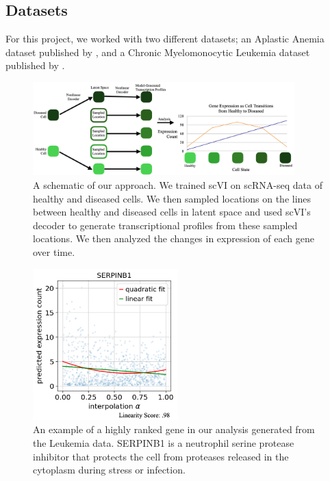 \documentclass{article}
\begin{document}
\subsection{Datasets}
For this project, we worked with two different datasets; an Aplastic Anemia dataset published by \citet{tonglin_single-cell_2022}, and a Chronic Myelomonocytic Leukemia dataset published by \citet{ferrall-fairbanks_progenitor_2022}.

\begin{figure}
  \centering
  \includegraphics[width=0.9\textwidth]{cropped_approach.jpg}
  \caption{A schematic of our approach. 
  We trained scVI on scRNA-seq data of healthy and diseased cells.
  We then sampled locations on the lines between healthy and diseased cells in latent space and used scVI's decoder to generate transcriptional profiles from these sampled locations.
  We then analyzed the changes in expression of each gene over time.}
  \label{approach}
\end{figure}


\begin{figure}
  \centering
  \includegraphics[width=0.5\textwidth]{SERPINB1.jpg}
  \caption{An example of a highly ranked gene in our analysis generated from the \citet{ferrall-fairbanks_progenitor_2022} Leukemia data.
  SERPINB1 is a neutrophil serine protease inhibitor that protects the cell from proteases released in the cytoplasm during stress or infection.}
  \label{SERPINB1_graph}
\end{figure}
\end{document}
